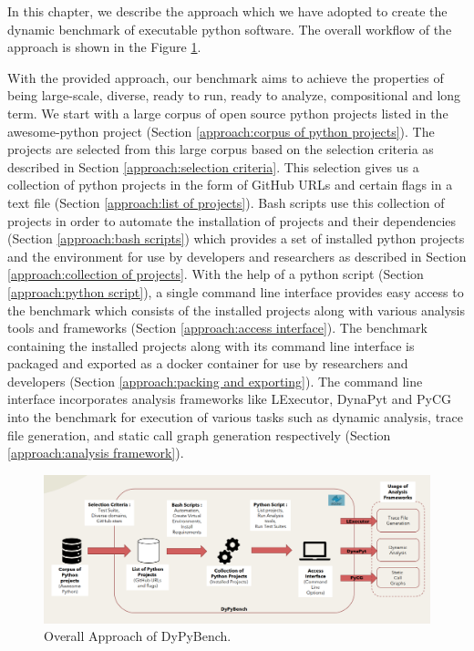 In this chapter, we describe the approach which we have adopted to create the dynamic benchmark of executable python software. The overall workflow of the approach is shown in the Figure \ref{fig:overall_approach}.

With the provided approach, our benchmark aims to achieve the properties of being large-scale, diverse, ready to run, ready to analyze, compositional and long term. We start with a large corpus of open source python projects listed in the awesome-python project (Section \ref{approach:corpus of python projects}). The projects are selected from this large corpus based on the selection criteria as described in Section \ref{approach:selection criteria}. This selection gives us a collection of python projects in the form of GitHub URLs and certain flags in a text file (Section \ref{approach:list of projects}). Bash scripts use this collection of projects in order to automate the installation of projects and their dependencies (Section \ref{approach:bash scripts}) which provides a set of installed python projects and the environment for use by developers and researchers as described in Section \ref{approach:collection of projects}. With the help of a python script (Section \ref{approach:python script}), a single command line interface provides easy access to the benchmark which consists of the installed projects along with various analysis tools and frameworks (Section \ref{approach:access interface}). The benchmark containing the installed projects along with its command line interface is packaged and exported as a docker container for use by researchers and developers (Section \ref{approach:packing and exporting}). The command line interface incorporates  analysis frameworks like LExecutor, DynaPyt and PyCG into the benchmark for execution of various tasks such as dynamic analysis, trace file generation, and static call graph generation respectively (Section \ref{approach:analysis framework}).

\begin{figure}[ht]
\centering
\includegraphics[width=1\linewidth]{figures/approach/DyPyBench.png}
\caption[Approach]{\label{fig:overall_approach}Overall Approach of DyPyBench.}
\end{figure}

